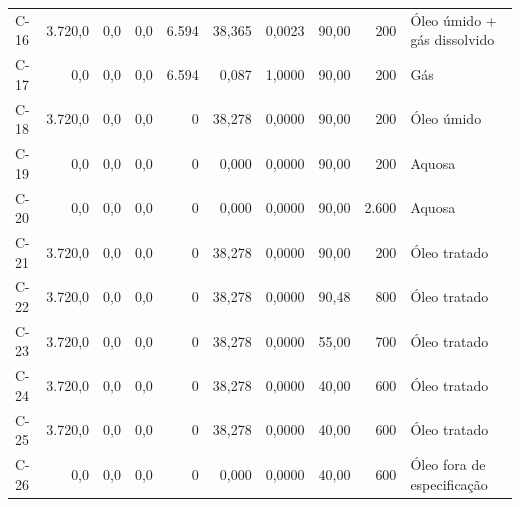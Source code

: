\documentclass[11pt,a4paper]{article}
\numberwithin{equation}{section}
\numberwithin{table}{section}
\numberwithin{figure}{section}
\begin{document}
{\begin{longtable}{lrrrrrrrrL{2.5cm}}
C-16 & 3.720,0 & 0,0 & 0,0 & 6.594 & 38,365 & 0,0023 & 90,00 & 200 & {\scriptsize Óleo úmido + gás dissolvido}\\
C-17 & 0,0 & 0,0 & 0,0 & 6.594 & 0,087 & 1,0000 & 90,00 & 200 & {\scriptsize Gás}\\
C-18 & 3.720,0 & 0,0 & 0,0 & 0 & 38,278 & 0,0000 & 90,00 & 200 & {\scriptsize Óleo úmido}\\
C-19 & 0,0 & 0,0 & 0,0 & 0 & 0,000 & 0,0000 & 90,00 & 200 & {\scriptsize Aquosa}\\
C-20 & 0,0 & 0,0 & 0,0 & 0 & 0,000 & 0,0000 & 90,00 & 2.600 & {\scriptsize Aquosa}\\
C-21 & 3.720,0 & 0,0 & 0,0 & 0 & 38,278 & 0,0000 & 90,00 & 200 & {\scriptsize Óleo tratado}\\
C-22 & 3.720,0 & 0,0 & 0,0 & 0 & 38,278 & 0,0000 & 90,48 & 800 & {\scriptsize Óleo tratado}\\
C-23 & 3.720,0 & 0,0 & 0,0 & 0 & 38,278 & 0,0000 & 55,00 & 700 & {\scriptsize Óleo tratado}\\
C-24 & 3.720,0 & 0,0 & 0,0 & 0 & 38,278 & 0,0000 & 40,00 & 600 & {\scriptsize Óleo tratado}\\
C-25 & 3.720,0 & 0,0 & 0,0 & 0 & 38,278 & 0,0000 & 40,00 & 600 & {\scriptsize Óleo tratado}\\
C-26 & 0,0 & 0,0 & 0,0 & 0 & 0,000 & 0,0000 & 40,00 & 600 & {\scriptsize Óleo fora de especificação}\\
\bottomrule\end{longtable}}
\end{document}
